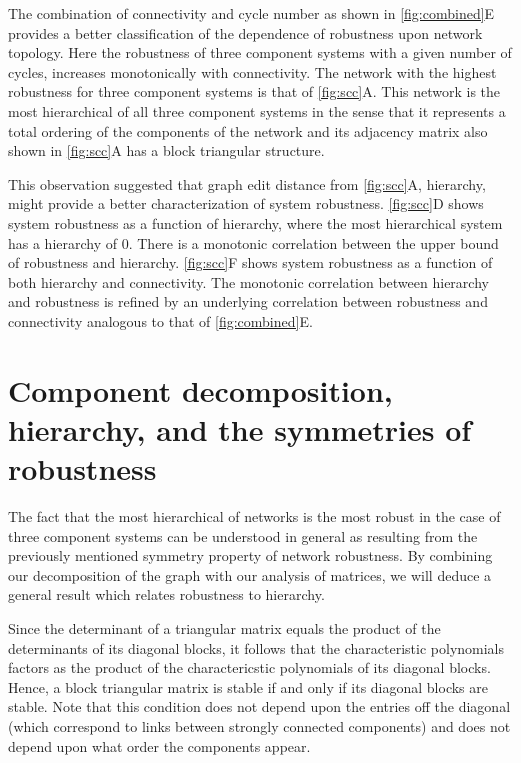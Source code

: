 The combination of connectivity and cycle number as shown in \ref{fig:combined}E provides a better classification of the dependence of robustness upon network topology. Here the robustness of three component systems with a given number of cycles, increases monotonically with connectivity. The network with the highest robustness for three component systems is that of \ref{fig:scc}A. This network is the most hierarchical of all three component systems in the sense that it represents a total ordering of the components of the network and its adjacency matrix also shown in \ref{fig:scc}A has a block triangular structure.

This observation suggested that graph edit distance from \ref{fig:scc}A, hierarchy, might provide a better characterization of system robustness. \ref{fig:scc}D shows system robustness as a function of hierarchy, where the most hierarchical system has a hierarchy of 0. There is a monotonic correlation between the upper bound of robustness and hierarchy. \ref{fig:scc}F shows system robustness as a function of both hierarchy and connectivity. The monotonic correlation between hierarchy and robustness is refined by an underlying correlation between robustness and connectivity analogous to that of \ref{fig:combined}E.

\section{Component decomposition, hierarchy, and the symmetries of robustness}

The fact that the most hierarchical of networks is the most robust in the case of three component systems can be understood in general as resulting from the previously mentioned symmetry property of network robustness.  By combining our decomposition of the graph with our analysis of matrices, we will deduce a general result which relates robustness to hierarchy.

Since the determinant of a triangular matrix equals the product of the determinants of its diagonal blocks, it follows that the characteristic polynomials factors as the product of the charactericstic polynomials of its diagonal blocks.  Hence, a block triangular matrix is stable if and only if its diagonal blocks are stable.  Note that this condition does not depend upon the entries off the diagonal (which correspond to links between strongly connected components) and does not depend upon what order the components appear.

